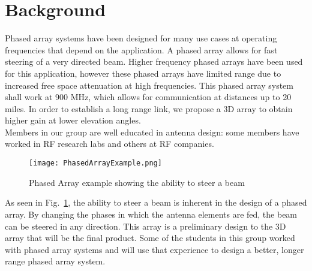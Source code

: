 \documentclass[UROP.tex]{subfiles}
\begin{document}
\bigskip
\section{\Large Background}
	Phased array systems have been designed for many use cases at operating frequencies that depend on the application.  A phased array allows for fast steering of a very directed beam.  Higher frequency phased arrays have been used for this application, however these phased arrays have limited range due to increased free space attenuation at high frequencies.  This phased array system shall work at 900 MHz, which allows for communication at distances up to 20 miles.  In order to establish a long range link, we propose a 3D array to obtain higher gain at lower elevation angles. \\
	
	Members in our group are well educated in antenna design: some members have worked in RF research labs and others at RF companies.  
	
\begin{figure}[H]
\centering
	\texttt{[image: PhasedArrayExample.png]}
	\caption{ Phased Array example showing the ability to steer a beam\label{fig:PAexample}}
\end{figure}
	
	As seen in Fig.~\ref{fig:PAexample}, the ability to steer a beam is inherent in the design of a phased array.  By changing the phases in which the antenna elements are fed, the beam can be steered in any direction. This array is a preliminary design to the 3D array that will be the final product.  Some of the students in this group worked with phased array systems and will use that experience to design a better, longer range phased array system.  
\end{document}
